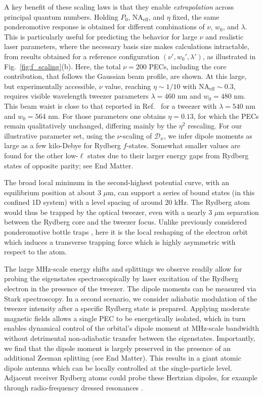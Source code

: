 \documentclass[aps,prl,groupedaddress,superscriptaddress,twocolumn,10pt,longbibliography]{revtex4-2}
\begin{document}
A key benefit of these scaling laws is that they enable \emph{extrapolation} across principal quantum numbers. Holding $P_0$, $\mathrm{NA}_{\mathrm{eff}}$, and $\eta$ fixed, the same ponderomotive response is obtained for different combinations of  $\nu$, $w_0$, and $\lambda$.
This is particularly useful for predicting the behavior for large $\nu$ and realistic laser parameters, where the necessary basis size makes calculations intractable, from results obtained for a reference configuration $(\nu',w_0',\lambda')$, as illustrated in Fig.~\ref{fig:f_scaling}(b).
Here, the total $\nu {=} 200$ PECs, including the core contribution, that follows the Gaussian beam profile, are shown. At this large, but experimentally accessible, $\nu$ value, reaching $\eta \! \sim \! 1/10$ with $\mathrm{NA_{eff}\sim0.3}$, requires visible wavelength tweezer parameters $\lambda=460$ nm and $w_0=480$ nm. This beam waist is close to that  reported in Ref.~\cite{Holzl2024} for a tweezer with $\lambda=540$ nm and $w_0=564$ nm. For those parameters one obtains $\eta=0.13$, for which the PECs remain qualitatively unchanged, differing mainly by the $\eta^2$ rescaling. For our illustrative parameter set, using the $\nu$-scaling of $\mathcal{D}_x$, we infer dipole moments as large as a few kilo-Debye for Rydberg $f$-states. Somewhat smaller values are found for the other low-$\ell$  states due to their larger energy gaps from Rydberg states of opposite parity; see End Matter.

The broad local minimum in the second-highest potential curve, with an equilibrium position at about 3 $\mu$m, can support a series of bound states (in this confined 1D system) with a level spacing of around 20 kHz.
The Rydberg atom would thus be trapped by the optical tweezer, even with a nearly 3 $\mu$m separation between the Rydberg core and the tweezer focus. Unlike previously considered ponderomotive bottle traps \cite{Duta2000,Barredo2020}, here it is the local reshaping of the electron orbit which induces a transverse trapping force which is highly asymmetric with respect to the atom.

The large MHz-scale energy shifts and splittings we observe readily allow for probing the eigenstates spectroscopically by laser excitation of the Rydberg electron in the presence of the tweezer.
The dipole moments can be measured via Stark spectroscopy.
In a second scenario, we consider adiabatic modulation of the tweezer intensity after a specific Rydberg state is prepared. Applying moderate magnetic fields allows a single PEC to be energetically isolated, which in turn enables dynamical control of the orbital's dipole moment at MHz-scale bandwidth without detrimental non-adiabatic transfer between the eigenstates. Importantly, we find that the dipole moment is largely preserved in the presence of an additional Zeeman splitting (see End Matter). This results in a giant atomic dipole antenna which can be locally controlled at the single-particle level. Adjacent receiver Rydberg atoms could probe these Hertzian dipoles, for example through radio-frequency dressed resonances \cite{Adams2020}.
\end{document}
